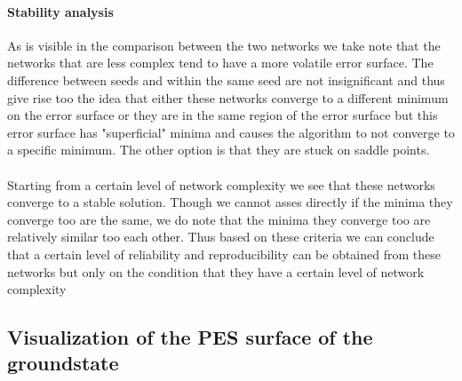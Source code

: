 \documentclass[12pt]{article}
\begin{document}
\paragraph{Stability analysis}
As is visible in the comparison between the two networks we take note that the networks that are less complex tend to have a more volatile error surface. The difference between seeds and within the same seed are not insignificant and thus give rise too the idea that either these networks converge to a different minimum on the error surface or they are in the same region of the error surface but this error surface has "superficial" minima and causes the algorithm to not converge to a specific minimum. The other option is that they are stuck on saddle points.
\\
\\
Starting from a certain level of network complexity we see that these networks converge to a stable solution. Though we cannot asses directly if the minima they converge too are the same, we do note that the minima they converge too are relatively similar too each other. Thus based on these criteria we can conclude that a certain level of reliability and reproducibility can be obtained from these networks but only on the condition that they have a certain level of network complexity 

\subsection{Visualization of the PES surface of the groundstate}
\end{document}
